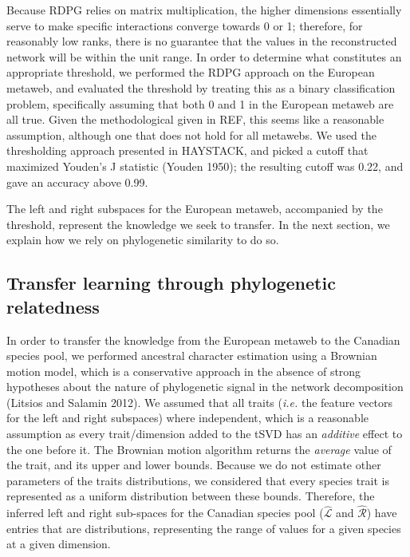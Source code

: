 \documentclass[11pt]{article}
\begin{document}
Because RDPG relies on matrix multiplication, the higher dimensions
essentially serve to make specific interactions converge towards 0 or 1;
therefore, for reasonably low ranks, there is no guarantee that the
values in the reconstructed network will be within the unit range. In
order to determine what constitutes an appropriate threshold, we
performed the RDPG approach on the European metaweb, and evaluated the
threshold by treating this as a binary classification problem,
specifically assuming that both 0 and 1 in the European metaweb are all
true. Given the methodological given in REF, this seems like a
reasonable assumption, although one that does not hold for all metawebs.
We used the thresholding approach presented in HAYSTACK, and picked a
cutoff that maximized Youden's J statistic (Youden 1950); the resulting
cutoff was 0.22, and gave an accuracy above 0.99.

The left and right subspaces for the European metaweb, accompanied by
the threshold, represent the knowledge we seek to transfer. In the next
section, we explain how we rely on phylogenetic similarity to do so.

\hypertarget{transfer-learning-through-phylogenetic-relatedness}{%
\subsection{Transfer learning through phylogenetic
relatedness}\label{transfer-learning-through-phylogenetic-relatedness}}

In order to transfer the knowledge from the European metaweb to the
Canadian species pool, we performed ancestral character estimation using
a Brownian motion model, which is a conservative approach in the absence
of strong hypotheses about the nature of phylogenetic signal in the
network decomposition (Litsios and Salamin 2012). We assumed that all
traits (\emph{i.e.} the feature vectors for the left and right
subspaces) where independent, which is a reasonable assumption as every
trait/dimension added to the tSVD has an \emph{additive} effect to the
one before it. The Brownian motion algorithm returns the \emph{average}
value of the trait, and its upper and lower bounds. Because we do not
estimate other parameters of the traits distributions, we considered
that every species trait is represented as a uniform distribution
between these bounds. Therefore, the inferred left and right sub-spaces
for the Canadian species pool (\(\hat{\mathcal{L}}\) and
\(\hat{\mathcal{R}}\)) have entries that are distributions, representing
the range of values for a given species at a given dimension.
\end{document}
